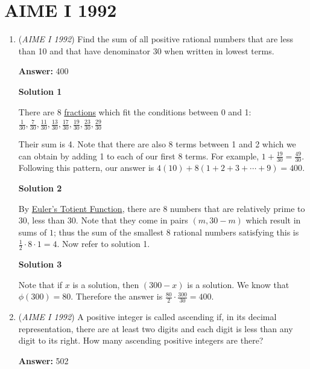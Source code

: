 \section{AIME I 1992}
        \begin{enumerate}
        	\item (\textit{AIME I 1992}) Find the sum of all positive rational numbers that are less than 10 and that have denominator 30 when written in lowest terms.


 
 \textbf{Answer: }400



\textbf{Solution 1}

There are 8 \href{https://artofproblemsolving.com/wiki/index.php?title=Fraction}{fractions} which fit the conditions between 0 and 1: $\frac{1}{30},\frac{7}{30},\frac{11}{30},\frac{13}{30},\frac{17}{30},\frac{19}{30},\frac{23}{30},\frac{29}{30}$

 Their sum is 4. Note that there are also 8 terms between 1 and 2 which we can obtain by adding 1 to each of our first 8 terms. For example, $1+\frac{19}{30}=\frac{49}{30}.$ Following this pattern, our answer is $4(10)+8(1+2+3+\cdots+9)=\boxed{400}.$




\textbf{Solution 2}

By \href{https://artofproblemsolving.com/wiki/index.php?title=Euler\%27s\_Totient\_Function}{Euler's Totient Function}, there are $8$ numbers that are relatively prime to $30$, less than $30$. Note that they come in pairs $(m,30-m)$ which result in sums of $1$; thus the sum of the smallest $8$ rational numbers satisfying this is $\frac12\cdot8\cdot1=4$. Now refer to solution 1.

 



\textbf{Solution 3}

Note that if $x$ is a solution, then $(300-x)$ is a solution. We know that $\phi(300) = 80.$ Therefore the answer is $\frac{80}{2} \cdot\frac{300}{30} = \boxed{400}.$



	\item (\textit{AIME I 1992}) A positive integer is called ascending if, in its decimal representation, there are at least two digits and each digit is less than any digit to its right. 
How many ascending positive integers are there?


 
 \textbf{Answer: }502




\end{enumerate}
